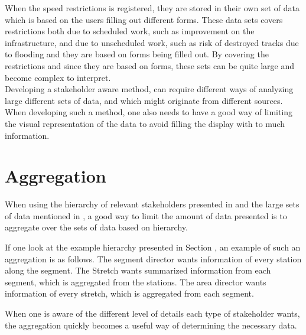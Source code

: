 When the speed restrictions is registered, they are stored in their own set of
data which is based on the users filling out different forms. These data sets 
covers restrictions  both due to scheduled work, such as improvement on the 
infrastructure, and due  to unscheduled work, such as risk of destroyed tracks 
due to flooding and they are based on forms being filled out. By covering the 
restrictions and since they are based on forms, these sets can be quite large 
and become complex to interpret.\\

Developing a stakeholder aware method, can require different ways of analyzing
large different sets of data, and which might originate from different sources.
When developing such a method, one also needs to have a good way of limiting
the visual representation of the data to avoid filling the display with to much
information.

\section{Aggregation} %
\label{sec:back_aggregation}

When using the hierarchy of relevant stakeholders presented in 
and the large sets of data mentioned in , a
good way to limit the amount of data presented is to aggregate over the sets of
data based on hierarchy.

If one look at the example hierarchy presented in Section
, an example of such an aggregation is as
follows. The segment director wants information of every station along the
segment. The Stretch wants summarized information from each segment, which is
aggregated from the stations. The area director wants information of every
stretch, which is aggregated from each segment.

When one is aware of the different level of details each type of stakeholder
wants, the aggregation quickly becomes a useful way of determining the
necessary data.

